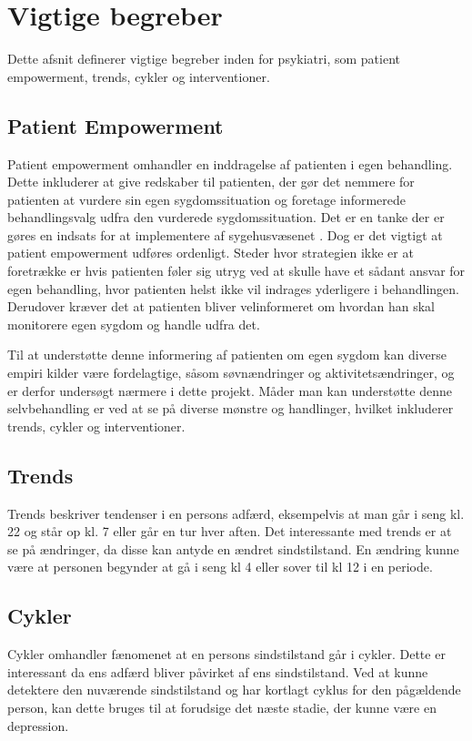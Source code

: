 \chapter{Vigtige begreber}
Dette afsnit definerer vigtige begreber inden for psykiatri, som patient empowerment, trends, cykler og interventioner.

\section{Patient Empowerment}\label{sec:patientempowerment}
Patient empowerment omhandler en inddragelse af patienten i egen behandling.
Dette inkluderer at give redskaber til patienten, der gør det nemmere for patienten at vurdere sin egen sygdomssituation og foretage informerede behandlingsvalg udfra den vurderede sygdomssituation.
Det er en tanke der er gøres en indsats for at implementere af sygehusvæsenet \citep{misc:patientpowerhovedstaden}.
Dog er det vigtigt at patient empowerment udføres ordenligt.
Steder hvor strategien ikke er at foretrække er hvis patienten føler sig utryg ved at skulle have et sådant ansvar for egen behandling, hvor patienten helst ikke vil indrages yderligere i behandlingen.
Derudover kræver det at patienten bliver velinformeret om hvordan han skal monitorere egen sygdom og handle udfra det.

Til at understøtte denne informering af patienten om egen sygdom kan diverse empiri kilder være fordelagtige, såsom søvnændringer og aktivitetsændringer\citep{misc:jorgen-aagaard}, og er derfor undersøgt nærmere i dette projekt.
Måder man kan understøtte denne selvbehandling er ved at se på diverse mønstre og handlinger, hvilket inkluderer trends, cykler og interventioner.

\section{Trends}
Trends beskriver tendenser i en persons adfærd, eksempelvis at man går i seng kl. 22 og står op kl. 7 eller går en tur hver aften.
Det interessante med trends er at se på ændringer, da disse kan antyde en ændret sindstilstand.
En ændring kunne være at personen begynder at gå i seng kl 4 eller sover til kl 12 i en periode.

\section{Cykler}
Cykler omhandler fænomenet at en persons sindstilstand går i cykler.
Dette er interessant da ens adfærd bliver påvirket af ens sindstilstand.
Ved at kunne detektere den nuværende sindstilstand og har kortlagt cyklus for den pågældende person, kan dette bruges til at forudsige det næste stadie, der kunne være en depression.

